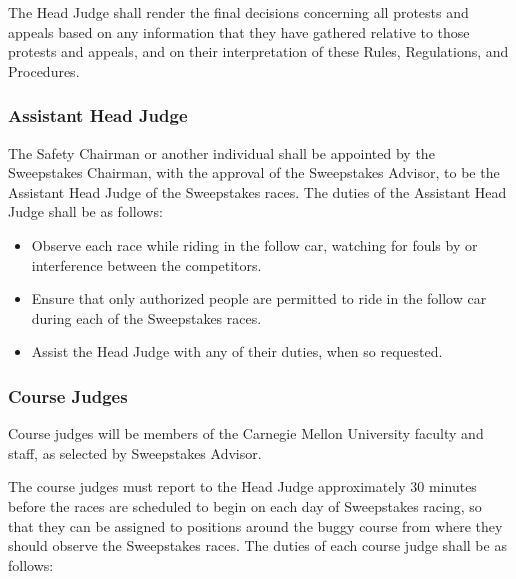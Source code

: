 	The Head Judge shall render the final decisions concerning all protests and appeals based on any information that they have gathered relative to those protests and appeals, and on their interpretation of these Rules, Regulations, and Procedures.


\subsubsection{Assistant Head Judge}

	The Safety Chairman or another individual shall be appointed by the Sweepstakes Chairman, with the approval of the Sweepstakes Advisor, to be the Assistant Head Judge of the Sweepstakes races. The duties of the Assistant Head Judge shall be as follows:

	\begin{itemize}

		\item Observe each race while riding in the follow car, watching for fouls by or interference between the competitors.

		\item Ensure that only authorized people are permitted to ride in the follow car during each of the Sweepstakes races.

		\item Assist the Head Judge with any of their duties, when so requested.

	\end{itemize}

\subsubsection{Course Judges}

	Course judges will be members of the Carnegie Mellon University faculty and staff, as selected by Sweepstakes Advisor.

	The course judges must report to the Head Judge approximately 30 minutes before the races are scheduled to begin on each day of Sweepstakes racing, so that they can be assigned to positions around the buggy course from where they should observe the Sweepstakes races. The duties of each course judge shall be as follows:


